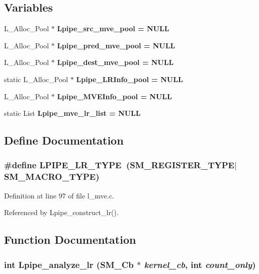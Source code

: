 \subsection*{Variables}
\begin{CompactItemize}
\item 
L\_\-Alloc\_\-Pool $\ast$ \bf{Lpipe\_\-src\_\-mve\_\-pool} = NULL
\item 
L\_\-Alloc\_\-Pool $\ast$ \bf{Lpipe\_\-pred\_\-mve\_\-pool} = NULL
\item 
L\_\-Alloc\_\-Pool $\ast$ \bf{Lpipe\_\-dest\_\-mve\_\-pool} = NULL
\item 
static L\_\-Alloc\_\-Pool $\ast$ \bf{Lpipe\_\-LRInfo\_\-pool} = NULL
\item 
L\_\-Alloc\_\-Pool $\ast$ \bf{Lpipe\_\-MVEInfo\_\-pool} = NULL
\item 
static List \bf{Lpipe\_\-mve\_\-lr\_\-list} = NULL
\end{CompactItemize}


\subsection{Define Documentation}
\subsubsection{\setlength{\rightskip}{0pt plus 5cm}\#define LPIPE\_\-LR\_\-TYPE~(\bf{SM\_\-REGISTER\_\-TYPE}$|$\bf{SM\_\-MACRO\_\-TYPE})}\label{l__mve_8c_266ef6e31198aaf35fff458b7b01346c}




Definition at line 97 of file l\_\-mve.c.

Referenced by Lpipe\_\-construct\_\-lr().

\subsection{Function Documentation}
\subsubsection{\setlength{\rightskip}{0pt plus 5cm}int Lpipe\_\-analyze\_\-lr (\bf{SM\_\-Cb} $\ast$ {\em kernel\_\-cb}, int {\em count\_\-only})}\label{l__mve_8c_66180998b7a313e243cc0cef7058723e}




